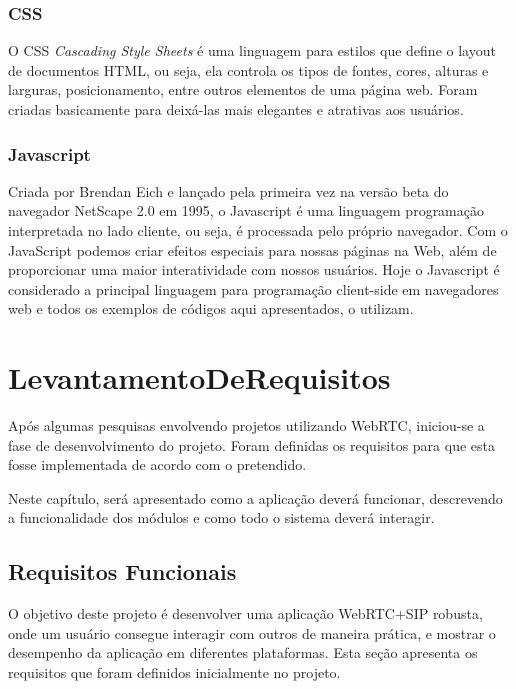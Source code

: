 \documentclass[ruledheader]{abnt} %
\begin{document}
\subsection{CSS}
\label{ss_css}
O CSS \textit{Cascading Style Sheets} é uma linguagem para estilos que define o layout de documentos HTML, ou seja, ela controla os tipos de  fontes, cores, alturas e larguras, posicionamento, entre outros elementos de uma página web. Foram criadas basicamente para deixá-las mais elegantes e atrativas aos usuários.

\subsection{Javascript}
\label{ss_javascript}
Criada por Brendan Eich e lançado pela primeira vez na versão beta do navegador NetScape 2.0 em 1995, o Javascript é uma linguagem programação interpretada no lado cliente, ou seja, é processada pelo próprio navegador. Com o JavaScript podemos criar efeitos especiais para nossas páginas na Web, além de proporcionar uma maior interatividade com nossos usuários. \cite{JAVASCRIPT}
Hoje o Javascript é considerado a principal linguagem para programação client-side em navegadores web e todos os exemplos de códigos aqui apresentados, o utilizam. 

\chapter{LevantamentoDeRequisitos} %
\label{c_levamtamentoDeRequisitos} %
Após algumas pesquisas envolvendo projetos utilizando WebRTC, iniciou-se a fase de desenvolvimento do projeto. Foram definidas os requisitos para que esta fosse implementada de acordo com o pretendido.

Neste capítulo, será apresentado como a aplicação deverá funcionar, descrevendo a funcionalidade dos módulos e como todo o sistema deverá interagir.

\section{Requisitos Funcionais}
\label{s_requisitosFuncionais}
O objetivo deste projeto é desenvolver uma aplicação WebRTC+SIP robusta, onde um usuário consegue interagir com outros de maneira prática, e mostrar o desempenho da aplicação em diferentes plataformas. Esta seção apresenta os requisitos que foram definidos inicialmente no projeto. 
\end{document}
